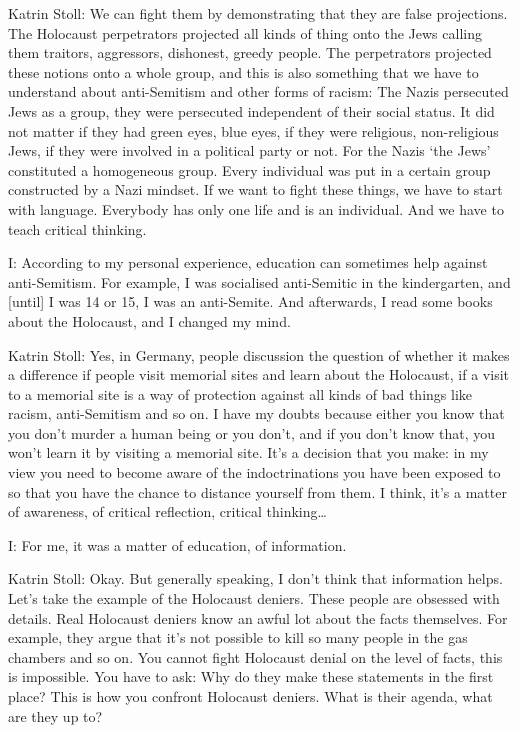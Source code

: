  

Katrin Stoll: We can fight them by demonstrating that they are false projections. The Holocaust perpetrators projected all kinds of thing onto the Jews calling them traitors, aggressors, dishonest, greedy people. The perpetrators projected these notions onto a whole group, and this is also something that we have to understand about anti-Semitism and other forms of racism: The Nazis persecuted Jews as a group, they were persecuted independent of their social status. It did not matter if they had green eyes, blue eyes, if they were religious, non-religious Jews, if they were involved in a political party or not. For the Nazis ‘the Jews’ constituted a homogeneous group. Every individual was put in a certain group constructed by a Nazi mindset. If we want to fight these things, we have to start with language. Everybody has only one life and is an individual. And we have to teach critical thinking.   

 

I: According to my personal experience, education can sometimes help against anti-Semitism. For example, I was socialised anti-Semitic in the kindergarten, and [until] I was 14 or 15, I was an anti-Semite. And afterwards, I read some books about the Holocaust, and I changed my mind. 

 

Katrin Stoll: Yes, in Germany, people discussion the question of whether it makes a difference if people visit memorial sites and learn about the Holocaust, if a visit to a memorial site is a way of protection against all kinds of bad things like racism, anti-Semitism and so on. I have my doubts because either you know that you don’t murder a human being or you don’t, and if you don’t know that, you won’t learn it by visiting a memorial site. It’s a decision that you make: in my view you need to become aware of the indoctrinations you have been exposed to so that you have the chance to distance yourself from them. I think, it’s a matter of awareness, of critical reflection, critical thinking… 

 

I: For me, it was a matter of education, of information. 

 

Katrin Stoll: Okay. But generally speaking, I don’t think that information helps. Let’s take the example of the Holocaust deniers.  These people are obsessed with details. Real Holocaust deniers know an awful lot about the facts themselves. For example, they argue that it’s not possible to kill so many people in the gas chambers and so on. You cannot fight Holocaust denial on the level of facts, this is impossible. You have to ask: Why do they make these statements in the first place? This is how you confront Holocaust deniers. What is their agenda, what are they up to? 


